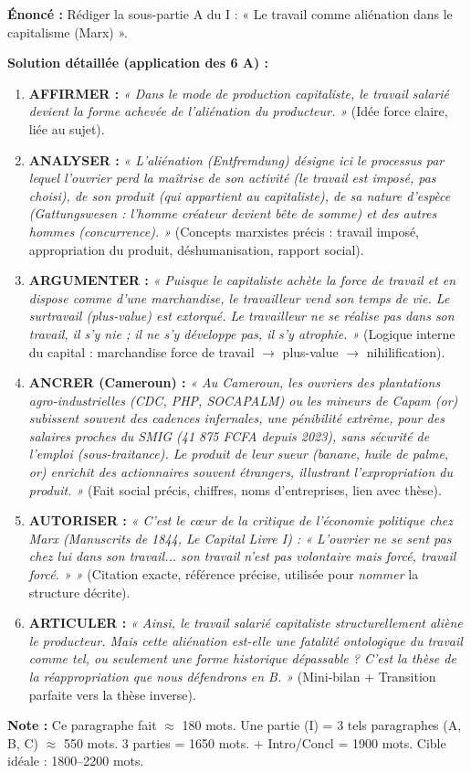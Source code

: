 \documentclass[11pt]{article}
\begin{document}
\begin{exoresolu}
\textbf{Énoncé :} Rédiger la sous-partie A du I : « Le travail comme aliénation dans le capitalisme (Marx) ».

\textbf{Solution détaillée (application des 6 A) :}
\begin{enumerate}
    \item \textbf{AFFIRMER :} \emph{« Dans le mode de production capitaliste, le travail salarié devient la forme achevée de l'aliénation du producteur. »} (Idée force claire, liée au sujet).
    \item \textbf{ANALYSER :} \emph{« L'aliénation (Entfremdung) désigne ici le processus par lequel l'ouvrier perd la maîtrise de son activité (le travail est imposé, pas choisi), de son produit (qui appartient au capitaliste), de sa nature d'espèce (Gattungswesen : l'homme créateur devient bête de somme) et des autres hommes (concurrence). »} (Concepts marxistes précis : travail imposé, appropriation du produit, déshumanisation, rapport social).
    \item \textbf{ARGUMENTER :} \emph{« Puisque le capitaliste achète la force de travail et en dispose comme d'une marchandise, le travailleur vend son temps de vie. Le surtravail (plus-value) est extorqué. Le travailleur ne se réalise pas dans son travail, il s'y nie ; il ne s'y développe pas, il s'y atrophie. »} (Logique interne du capital : marchandise force de travail $\rightarrow$ plus-value $\rightarrow$ nihilification).
    \item \textbf{ANCRER (Cameroun) :} \emph{« Au Cameroun, les ouvriers des plantations agro-industrielles (CDC, PHP, SOCAPALM) ou les mineurs de Capam (or) subissent souvent des cadences infernales, une pénibilité extrême, pour des salaires proches du SMIG (41 875 FCFA depuis 2023), sans sécurité de l'emploi (sous-traitance). Le produit de leur sueur (banane, huile de palme, or) enrichit des actionnaires souvent étrangers, illustrant l'expropriation du produit. »} (Fait social précis, chiffres, noms d'entreprises, lien avec thèse).
    \item \textbf{AUTORISER :} \emph{« C'est le cœur de la critique de l'économie politique chez Marx (\textit{Manuscrits de 1844}, \textit{Le Capital} Livre I) : « L'ouvrier ne se sent pas chez lui dans son travail... son travail n'est pas volontaire mais forcé, travail forcé. » »} (Citation exacte, référence précise, utilisée pour \emph{nommer} la structure décrite).
    \item \textbf{ARTICULER :} \emph{« Ainsi, le travail salarié capitaliste structurellement aliène le producteur. Mais cette aliénation est-elle une fatalité ontologique du travail comme tel, ou seulement une forme historique dépassable ? C'est la thèse de la réappropriation que nous défendrons en B. »} (Mini-bilan + Transition parfaite vers la thèse inverse).
\end{enumerate}
\textbf{Note :} Ce paragraphe fait $\approx$ 180 mots. Une partie (I) = 3 tels paragraphes (A, B, C) $\approx$ 550 mots. 3 parties = 1650 mots. + Intro/Concl = 1900 mots. Cible idéale : 1800--2200 mots.
\end{exoresolu}
\end{document}
